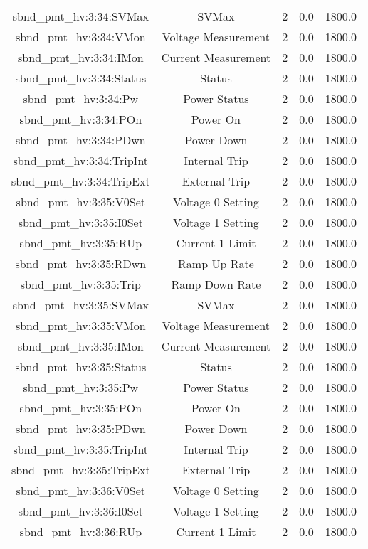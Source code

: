 \begin{center}
\begin{longtable}{c | c c c c }
sbnd\_pmt\_hv:3:34:SVMax & SVMax & 2 & 0.0 & 1800.0\\ 
sbnd\_pmt\_hv:3:34:VMon & Voltage Measurement & 2 & 0.0 & 1800.0\\ 
sbnd\_pmt\_hv:3:34:IMon & Current Measurement & 2 & 0.0 & 1800.0\\ 
sbnd\_pmt\_hv:3:34:Status & Status & 2 & 0.0 & 1800.0\\ 
sbnd\_pmt\_hv:3:34:Pw & Power Status & 2 & 0.0 & 1800.0\\ 
sbnd\_pmt\_hv:3:34:POn & Power On & 2 & 0.0 & 1800.0\\ 
sbnd\_pmt\_hv:3:34:PDwn & Power Down & 2 & 0.0 & 1800.0\\ 
sbnd\_pmt\_hv:3:34:TripInt & Internal Trip & 2 & 0.0 & 1800.0\\ 
sbnd\_pmt\_hv:3:34:TripExt & External Trip & 2 & 0.0 & 1800.0\\ 
sbnd\_pmt\_hv:3:35:V0Set & Voltage 0 Setting & 2 & 0.0 & 1800.0\\ 
sbnd\_pmt\_hv:3:35:I0Set & Voltage 1 Setting & 2 & 0.0 & 1800.0\\ 
sbnd\_pmt\_hv:3:35:RUp & Current 1 Limit & 2 & 0.0 & 1800.0\\ 
sbnd\_pmt\_hv:3:35:RDwn & Ramp Up Rate & 2 & 0.0 & 1800.0\\ 
sbnd\_pmt\_hv:3:35:Trip & Ramp Down Rate & 2 & 0.0 & 1800.0\\ 
sbnd\_pmt\_hv:3:35:SVMax & SVMax & 2 & 0.0 & 1800.0\\ 
sbnd\_pmt\_hv:3:35:VMon & Voltage Measurement & 2 & 0.0 & 1800.0\\ 
sbnd\_pmt\_hv:3:35:IMon & Current Measurement & 2 & 0.0 & 1800.0\\ 
sbnd\_pmt\_hv:3:35:Status & Status & 2 & 0.0 & 1800.0\\ 
sbnd\_pmt\_hv:3:35:Pw & Power Status & 2 & 0.0 & 1800.0\\ 
sbnd\_pmt\_hv:3:35:POn & Power On & 2 & 0.0 & 1800.0\\ 
sbnd\_pmt\_hv:3:35:PDwn & Power Down & 2 & 0.0 & 1800.0\\ 
sbnd\_pmt\_hv:3:35:TripInt & Internal Trip & 2 & 0.0 & 1800.0\\ 
sbnd\_pmt\_hv:3:35:TripExt & External Trip & 2 & 0.0 & 1800.0\\ 
sbnd\_pmt\_hv:3:36:V0Set & Voltage 0 Setting & 2 & 0.0 & 1800.0\\ 
sbnd\_pmt\_hv:3:36:I0Set & Voltage 1 Setting & 2 & 0.0 & 1800.0\\ 
sbnd\_pmt\_hv:3:36:RUp & Current 1 Limit & 2 & 0.0 & 1800.0\\ 

\end{longtable}
\end{center}
